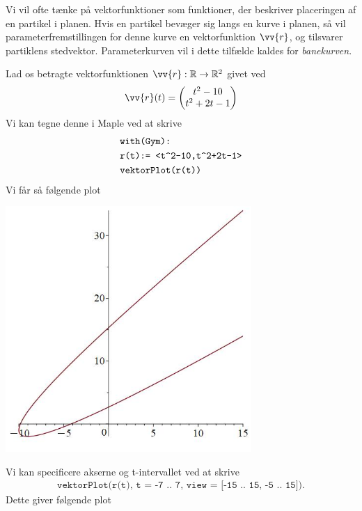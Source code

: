\begin{exa}
	Vi vil ofte tænke på vektorfunktioner som funktioner, der beskriver placeringen af en partikel i planen. Hvis en partikel bevæger sig langs en kurve i planen, så vil 
	parameterfremstillingen for denne kurve en vektorfunktion $\vv{r}$, og tilsvarer partiklens stedvektor. Parameterkurven vil i dette tilfælde kaldes for \textit{banekurven}. 
\end{exa}

\begin{exa}
	Lad os betragte vektorfunktionen $\vv{r}:\mathbb{R} \to \mathbb{R}^2$ givet ved
	\begin{align*}
		\vv{r}(t) = \begin{pmatrix}
			t^2-10\\
			t^2+2t-1
		\end{pmatrix}
	\end{align*}
	Vi kan tegne denne i Maple ved at skrive 
	\begin{align*}
		&\texttt{with(Gym):}\\
		&\texttt{r(t):= <t\string^2-10,t\string^2+2t-1>}\\
		&\texttt{vektorPlot(r(t))}
	\end{align*}
	Vi får så følgende plot
	\begin{center}
		\includegraphics[width=0.7\textwidth]{Billeder/vektor1.jpg}
	\end{center}
	Vi kan specificere akserne og t-intervallet ved at skrive
	\begin{align*}
		\texttt{vektorPlot(r(t), t = -7 .. 7, view = [-15 .. 15, -5 .. 15])}.
	\end{align*}
	Dette giver følgende plot
	\begin{center}

\end{center}
\end{exa}
